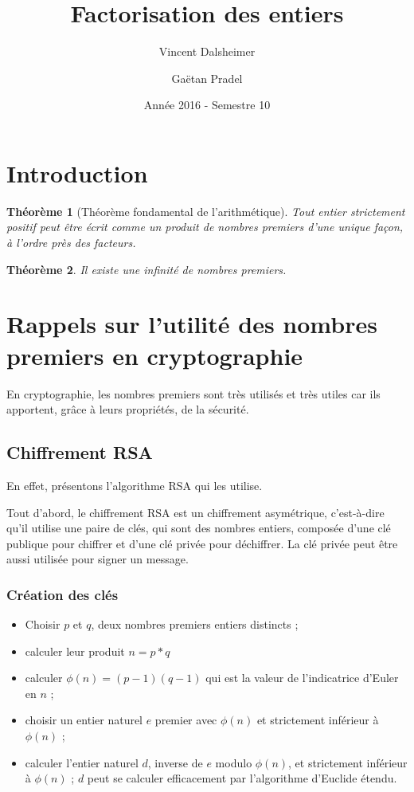 \documentclass[french, 12pt, titlepage]{article}
\newenvironment{itemH}[0]{\begin{itemize}[label=$\bullet$, font=\color{black} \large]}{\end{itemize}}
\newtheorem{theoreme}{Th{\'e}or{\`e}me}
\begin{document}
\title{Factorisation des entiers}
\author{Vincent Dalsheimer \and
	Gaëtan Pradel}
\date{Année 2016 - Semestre 10}
\maketitle
\tableofcontents

\newpage
\section{Introduction}

\begin{theoreme}[Théorème fondamental de l'arithmétique]
  Tout entier strictement positif peut être écrit comme un produit de nombres premiers d'une unique façon, à l'ordre près des facteurs.
\end{theoreme}


\begin{theoreme}
  Il existe une infinité de nombres premiers.
\end{theoreme}


\section{Rappels sur l'utilité des nombres premiers en cryptographie}
En cryptographie, les nombres premiers sont très utilisés et très utiles car ils apportent, grâce à leurs propriétés, de la sécurité.

\subsection{Chiffrement RSA}
En effet, présentons l'algorithme RSA qui les utilise.

Tout d'abord, le chiffrement RSA est un chiffrement asymétrique, c'est-à-dire qu'il utilise une paire de clés, qui sont des nombres entiers, composée d'une clé publique pour chiffrer et d'une clé privée pour déchiffrer.
La clé privée peut être aussi utilisée pour signer un message.

\subsubsection{Création des clés}

\begin{itemH}
\item Choisir $p$ et $q$, deux nombres premiers entiers distincts ;
\item calculer leur produit $n = p*q$
\item calculer $\phi (n) = (p - 1)(q - 1)$ qui est la valeur de l'indicatrice d'Euler en $n$ ;
\item choisir un entier naturel $e$ premier avec $\phi (n)$ et strictement inférieur à $\phi (n)$ ;
\item calculer l'entier naturel $d$, inverse de $e$ modulo $ \phi (n)$, et strictement inférieur à $\phi (n)$ ; $d$ peut se calculer efficacement par l'algorithme d'Euclide étendu.
\end{itemH}
\end{document}
